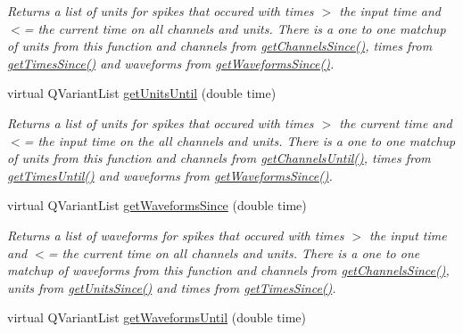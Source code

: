 \begin{DoxyCompactItemize}
\begin{DoxyCompactList}\small\item\em Returns a list of units for spikes that occured with times $>$ the input time and $<$= the current time on all channels and units. There is a one to one matchup of units from this function and channels from \hyperlink{class_picto_1_1_spike_state_a154d5d6c0a6c3b62115c4cfe9cebc024}{get\-Channels\-Since()}, times from \hyperlink{class_picto_1_1_spike_state_a3f5289c57f69cb73e38b55444b74853b}{get\-Times\-Since()} and waveforms from \hyperlink{class_picto_1_1_spike_state_a17daf1a1128b58cc00fb0ea815fb9fe4}{get\-Waveforms\-Since()}. \end{DoxyCompactList}\item 
\hypertarget{class_picto_1_1_spike_state_a73c82b648f2dc88b51c6b0de31b0a21a}{virtual Q\-Variant\-List \hyperlink{class_picto_1_1_spike_state_a73c82b648f2dc88b51c6b0de31b0a21a}{get\-Units\-Until} (double time)}\label{class_picto_1_1_spike_state_a73c82b648f2dc88b51c6b0de31b0a21a}

\begin{DoxyCompactList}\small\item\em Returns a list of units for spikes that occured with times $>$ the current time and $<$= the input time on the all channels and units. There is a one to one matchup of units from this function and channels from \hyperlink{class_picto_1_1_spike_state_aaab7883be0f0a4f035a9b0c7eb567da1}{get\-Channels\-Until()}, times from \hyperlink{class_picto_1_1_spike_state_ae132eb7cc369b9c174eac9dd38e00413}{get\-Times\-Until()} and waveforms from \hyperlink{class_picto_1_1_spike_state_a17daf1a1128b58cc00fb0ea815fb9fe4}{get\-Waveforms\-Since()}. \end{DoxyCompactList}\item 
\hypertarget{class_picto_1_1_spike_state_a17daf1a1128b58cc00fb0ea815fb9fe4}{virtual Q\-Variant\-List \hyperlink{class_picto_1_1_spike_state_a17daf1a1128b58cc00fb0ea815fb9fe4}{get\-Waveforms\-Since} (double time)}\label{class_picto_1_1_spike_state_a17daf1a1128b58cc00fb0ea815fb9fe4}

\begin{DoxyCompactList}\small\item\em Returns a list of waveforms for spikes that occured with times $>$ the input time and $<$= the current time on all channels and units. There is a one to one matchup of waveforms from this function and channels from \hyperlink{class_picto_1_1_spike_state_a154d5d6c0a6c3b62115c4cfe9cebc024}{get\-Channels\-Since()}, units from \hyperlink{class_picto_1_1_spike_state_a8f1866573bf338a9c4cc388a38ad5ada}{get\-Units\-Since()} and times from \hyperlink{class_picto_1_1_spike_state_a3f5289c57f69cb73e38b55444b74853b}{get\-Times\-Since()}. \end{DoxyCompactList}\item 
\hypertarget{class_picto_1_1_spike_state_a4368c50ce8f6a06395b1ea41cae26b2b}{virtual Q\-Variant\-List \hyperlink{class_picto_1_1_spike_state_a4368c50ce8f6a06395b1ea41cae26b2b}{get\-Waveforms\-Until} (double time)}\label{class_picto_1_1_spike_state_a4368c50ce8f6a06395b1ea41cae26b2b}


\end{DoxyCompactItemize}
